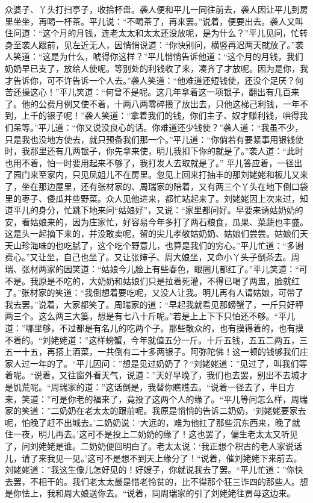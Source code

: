 \documentclass[12pt,oneside]{book}
\begin{document}
众婆子、丫头打扫亭子，收拾杯盘。袭人便和平儿一同往前去，袭人因让平儿到房里坐坐，再喝一杯茶。平儿说：“不喝茶了，再来罢。”说着，便要出去。袭人又叫住问道：“这个月的月钱，连老太太和太太还没放呢，是为什么？”平儿见问，忙转身至袭人跟前，见左近无人，因悄悄说道：“你快别问，横竖再迟两天就放了。”袭人笑道：“这是为什么，唬得你这样？”平儿悄悄告诉他道：“这个月的月钱，我们奶奶早已支了，放给人使呢。等别处的利钱收了来，凑齐了才放呢。因为是你，我才告诉你，可不许告诉一个人去。”袭人笑道：“他难道还短钱使，还没个足厌？何苦还操这心！”平儿笑道：“何曾不是呢。这几年拿着这一项银子，翻出有几百来了。他的公费月例又使不着，十两八两零碎攒了放出去，只他这梯己利钱，一年不到，上千的银子呢！”袭人笑道：“拿着我们的钱，你们主子、奴才赚利钱，哄得我们呆等。”平儿道：“你又说没良心的话。你难道还少钱使？”袭人道：“我虽不少，只是我也没地方使去，就只预备我们那一个。”平儿道：“你倘若有要紧事用银钱使时，我那里还有几两银子，你先拿来使，明儿我扣下你的就是了。”袭人道：“此时也用不着，怕一时要用起来不够了，我打发人去取就是了。”
平儿答应着，一径出了园门来至家内，只见凤姐儿不在房里。忽见上回来打抽丰的那刘姥姥和板儿又来了，坐在那边屋里，还有张材家的、周瑞家的陪着，又有两三个丫头在地下倒口袋里的枣子、倭瓜并些野菜。众人见他进来，都忙站起来了。刘姥姥因上次来过，知道平儿的身分，忙跳下地来问“姑娘好”，又说：“家里都问好。早要来请姑奶奶的安，看姑娘来的，因为庄家忙，好容易今年多打了两石粮食，瓜果、菜蔬也丰盛。这是头一起摘下来的，并没敢卖呢，留的尖儿孝敬姑奶奶、姑娘们尝尝。姑娘们天天山珍海味的也吃腻了，这个吃个野意儿，也算是我们的穷心。”平儿忙道：“多谢费心。”又让坐，自己也坐了。又让张婶子、周大娘坐，又命小丫头子倒茶去。周瑞、张材两家的因笑道：“姑娘今儿脸上有些春色，眼圈儿都红了。”平儿笑道：“可不是。我原是不吃的，大奶奶和姑娘们只是拉着死灌，不得已喝了两盅，脸就红了。”张材家的笑道：“我倒想着要吃呢，又没人让我。明儿再有人请姑娘，可带了我去罢。”说着，大家都笑了。周瑞家的道：“早起我就看见那螃蟹了，一斤只好秤两三个。这么两三大篓，想是有七八十斤呢。”若是上上下下只怕还不够。“平儿道：”哪里够，不过都是有名儿的吃两个子。那些散众的，也有摸得着的，也有摸不着的。“刘姥姥道：”这样螃蟹，今年就值五分一斤。十斤五钱，五五二两五，三五一十五，再搭上酒菜，一共倒有二十多两银子。阿弥陀佛！这一顿的钱够我们庄家人过一年的了。“平儿因问：”想是见过奶奶了？“刘姥姥道：”见过了，叫我们等着呢。“说着，又往窗外看天气，说道：”天好早晚了，我们也去罢，别出不去城才是饥荒呢。“周瑞家的道：”这话倒是，我替你瞧瞧去。“说着一径去了，半日方来，笑道：”可是你老的福来了，竟投了这两个人的缘了。“平儿等问怎么样，周瑞家的笑道：”二奶奶在老太太的跟前呢。我原是悄悄的告诉二奶奶，‘刘姥姥要家去呢，怕晚了赶不出城去。’二奶奶说：‘大远的，难为他扛了那些沉东西来，晚了就住一夜，明儿再去。’这可不是投上二奶奶的缘了！这也罢了，偏生老太太又听见了，问刘姥姥是谁。二奶奶便回明白了。老太太说：‘我正想个积古的老人家说话儿，请了来我见一见。’这可不是想不到天上缘分了！“说着，催刘姥姥下来前去。刘姥姥道：”我这生像儿怎好见的！好嫂子，你就说我去了罢。“平儿忙道：”你快去罢，不相干的。我们老太太最是惜老怜贫的，比不得那个狂三诈四的那些人。想是你怯上，我和周大娘送你去。“说着，同周瑞家的引了刘姥姥往贾母这边来。
\end{document}

